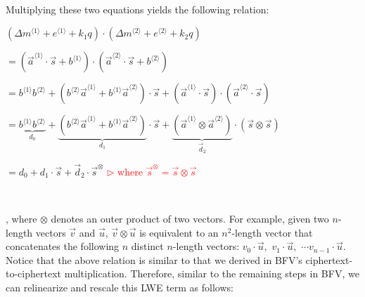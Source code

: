 $ $

Multiplying these two equations yields the following relation: 


$(\Delta m^{\langle 1 \rangle} + e^{\langle 1 \rangle} + k_1q) \cdot (\Delta m^{\langle 2 \rangle} + e^{\langle 2 \rangle} + k_2q)$

$ = (\vec{a}^{\langle 1 \rangle} \cdot \vec{s} + b^{\langle 1 \rangle}) \cdot (\vec{a}^{\langle 2 \rangle} \cdot \vec{s} + b^{\langle 2 \rangle})$ 

$ = b^{\langle 1 \rangle}b^{\langle 2 \rangle}  + (b^{\langle 2 \rangle}\vec{a}^{\langle 1 \rangle} + b^{\langle 1 \rangle}\vec{a}^{\langle 2 \rangle}) \cdot \vec{s} + (\vec{a}^{\langle 1 \rangle} \cdot \vec{s}) \cdot (\vec{a}^{\langle 2 \rangle} \cdot \vec{s}) $



$ = \underbrace{b^{\langle 1 \rangle}b^{\langle 2 \rangle}}_{d_0}  + \underbrace{(b^{\langle 2 \rangle}\vec{a}^{\langle 1 \rangle} + b^{\langle 1 \rangle}\vec{a}^{\langle 2 \rangle})}_{d_1} \cdot \vec{s} + \underbrace{(\vec{a}^{\langle 1 \rangle} \otimes \vec{a}^{\langle 2 \rangle})}_{\vec{d}_2} \cdot (\vec{s} \otimes \vec{s}) $  


$= d_0 + d_1\cdot \vec{s} + \vec{d}_2\cdot \vec{s}^{\otimes}$ \textcolor{red}{ $\rhd$ where $\vec{s}^{\otimes} = \vec{s} \otimes \vec{s}$}

$ $

, where $\otimes$ denotes an outer product of two vectors. For example, given two $n$-length vectors $\vec{v}$ and $\vec{u}$, $\vec{v} \otimes \vec{u}$ is equivalent to an $n^2$-length vector that concatenates the following $n$ distinct $n$-length vectors: $v_0\cdot\vec{u}, \,\, v_1\cdot\vec{u}, \,\, \cdots v_{n-1}\cdot\vec{u}$. Notice that the above relation is similar to that we derived in BFV's ciphertext-to-ciphertext multiplication. Therefore, similar to the remaining steps in BFV, we can relinearize and rescale this LWE term as follows:


